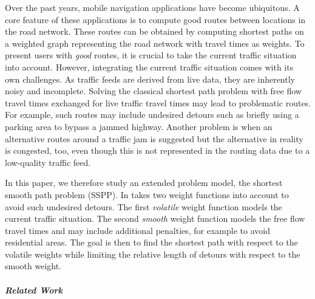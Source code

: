 \documentclass[a4paper,UKenglish,cleveref, autoref, thm-restate]{lipics-v2021}
\begin{document}
Over the past years, mobile navigation applications have become ubiquitous.
A core feature of these applications is to compute good routes between locations in the road network.
These routes can be obtained by computing shortest paths on a weighted graph representing the road network with travel times as weights.
To present users with \emph{good} routes, it is crucial to take the current traffic situation into account.
However, integrating the current traffic situation comes with its own challenges.
As traffic feeds are derived from live data, they are inherently noisy and incomplete.
Solving the classical shortest path problem with free flow travel times exchanged for live traffic travel times may lead to problematic routes.
For example, such routes may include undesired detours such as briefly using a parking area to bypass a jammed highway.
Another problem is when an alternative routes around a traffic jam is suggested but the alternative in reality is congested, too, even though this is not represented in the routing data due to a low-quality traffic feed.

In this paper, we therefore study an extended problem model, the shortest smooth path problem (SSPP).
In takes two weight functions into account to avoid such undesired detours.
The first \emph{volatile} weight function models the current traffic situation.
The second \emph{smooth} weight function models the free flow travel times and may include additional penalties, for example to avoid residential areas.
The goal is then to find the shortest path with respect to the volatile weights while limiting the relative length of detours with respect to the smooth weight.

\subparagraph{Related Work}
\end{document}
